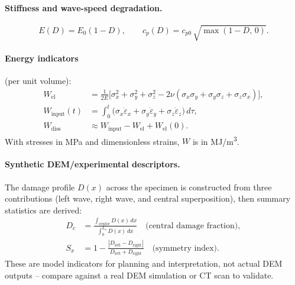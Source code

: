 \documentclass[11pt,a4paper]{article}
\newcommand{\sig}{\sigma}
\newcommand{\eps}{\varepsilon}
\newcommand{\epsdot}{\dot\eps}
\newcommand{\Ls}{L_s}
\begin{document}
\paragraph{Stiffness and wave-speed degradation.}
\begin{equation}
  E(D) = E_0 (1 - D), \qquad c_p(D) = c_{p0}\,\sqrt{\max(1 - D,\,0)}.
\end{equation}

\paragraph{Energy indicators} (per unit volume):
\begin{align}
  W_{\text{el}} &= \frac{1}{2E}\bigl[\sig_x^2 + \sig_y^2 + \sig_z^2
                   - 2\nu(\sig_x\sig_y + \sig_y\sig_z + \sig_z\sig_x)\bigr], \\
  W_{\text{input}}(t) &= \int_0^t \bigl(\sig_x \epsdot_x + \sig_y \epsdot_y + \sig_z \epsdot_z\bigr)\,d\tau, \\
  W_{\text{diss}} &\approx W_{\text{input}} - W_{\text{el}} + W_{\text{el}}(0).
\end{align}
With stresses in MPa and dimensionless strains, $W$ is in MJ/m\textsuperscript{3}.

\paragraph{Synthetic DEM/experimental descriptors.}
The damage profile $D(x)$ across the specimen is constructed from three
contributions (left wave, right wave, and central superposition), then summary
statistics are derived:
\begin{align}
  D_c &= \frac{\int_{\text{centre}} D(x)\,dx}{\int_0^{\Ls} D(x)\,dx}
       \quad \text{(central damage fraction)}, \\
  S_x &= 1 - \frac{|D_{\text{left}} - D_{\text{right}}|}{D_{\text{left}} + D_{\text{right}}}
       \quad \text{(symmetry index)}.
\end{align}
These are model indicators for planning and interpretation, not actual DEM
outputs -- compare against a real DEM simulation or CT scan to validate.
\end{document}
